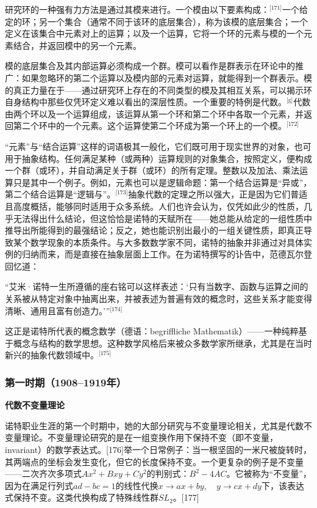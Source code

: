 研究环的一种强有力方法是通过其模来进行。一个模由以下要素构成：\(^\text{[171]}\)一个给定的环；另一个集合（通常不同于该环的底层集合），称为该模的底层集合；一个定义在该集合中元素对上的运算；以及一个运算，它将一个环的元素与模的一个元素结合，并返回模中的另一个元素。

模的底层集合及其内部运算必须构成一个群。模可以看作是群表示在环论中的推广：如果忽略环的第二个运算以及模内部的元素对运算，就能得到一个群表示。模的真正力量在于——通过研究环上存在的不同类型的模及其相互关系，可以揭示环自身结构中那些仅凭环定义难以看出的深层性质。一个重要的特例是代数。\(^\text{[g]}\)代数由两个环以及一个运算组成，该运算从第一个环和第二个环中各取一个元素，并返回第二个环中的一个元素。这个运算使第二个环成为第一个环上的一个模。\(^\text{[172]}\)

“元素”与“结合运算”这样的词语极其一般化，它们既可用于现实世界的对象，也可用于抽象结构。任何满足某种（或两种）运算规则的对象集合，按照定义，便构成一个群（或环），并自动满足关于群（或环）的所有定理。整数以及加法、乘法运算只是其中一个例子。例如，元素也可以是逻辑命题：第一个结合运算是“异或”，第二个结合运算是“逻辑与”。\(^\text{[173]}\)抽象代数的定理之所以强大，正是因为它们普适且高度概括，能够同时适用于众多系统。人们也许会认为，仅凭如此少的性质，几乎无法得出什么结论，但这恰恰是诺特的天赋所在——她总能从给定的一组性质中推导出所能得到的最强结论；反之，她也能识别出最小的一组关键性质，即真正导致某个数学现象的本质条件。与大多数数学家不同，诺特的抽象并非通过对具体实例的归纳而来，而是直接在抽象层面上工作。在为诺特撰写的讣告中，范德瓦尔登回忆道：

“艾米·诺特一生所遵循的座右铭可以这样表述：‘只有当数字、函数与运算之间的关系被从特定对象中抽离出来，并被表述为普遍有效的概念时，这些关系才能变得清晰、通用且富有创造力。’”\(^\text{[174]}\)

这正是诺特所代表的概念数学（德语：begriffliche Mathematik）——一种纯粹基于概念与结构的数学思想。这种数学风格后来被众多数学家所继承，尤其是在当时新兴的抽象代数领域中。\(^\text{[175]}\)
\subsubsection{第一时期（1908–1919年）}
\textbf{代数不变量理论}

诺特职业生涯的第一个时期中，她的大部分研究与不变量理论相关，尤其是代数不变量理论。不变量理论研究的是在一组变换作用下保持不变（即不变量，invariant）的数学表达式。[176]举一个日常例子：当一根坚固的一米尺被旋转时，其两端点的坐标会发生变化，但它的长度保持不变。一个更复杂的例子是不变量——二次齐次多项式$Ax^2 + Bxy + Cy^2$的判别式：$B^2 - 4AC$。它被称为“不变量”，因为在满足行列式$ad - bc = 1$的线性代换$x \to ax + by, \quad y \to cx + dy$下，该表达式保持不变。这类代换构成了特殊线性群$SL_2$。[177]

